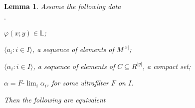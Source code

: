 \documentclass[12pt,letterpaper,oneside,reqno]{amsart}
\newcommand{\mylabel}[1]{{#1}\hfill}
\renewenvironment{itemize}
  {\begin{list}{$\cdot$}{%
   \setlength{\parskip}{0mm}
   \setlength{\topsep}{.2\baselineskip}
   \setlength{\rightmargin}{0mm}
   \setlength{\listparindent}{0mm}
   \setlength{\itemindent}{0mm}
   \setlength{\labelwidth}{3ex}
   \setlength{\itemsep}{.2\baselineskip}
   \setlength{\parsep}{.2\baselineskip}
   \setlength{\partopsep}{0mm}
   \setlength{\labelsep}{1ex}
   \setlength{\leftmargin}{\labelwidth+\labelsep}
   \let\makelabel\mylabel}}{%
   \end{list}}
\theoremstyle{plain}
\newtheorem{lemma}[theorem]{Lemma}
\theoremstyle{remark}
\begin{document}
\begin{lemma}\label{lem_HIapprox}
  Assume the following data
  \begin{itemize}
    \item $\varphi(x;y)\in\mathds{L}$;
    \item $\langle a_i:i\in I\rangle$, a sequence of elements of $M^{|x|}$;
    \item $\langle\alpha_i:i\in I\rangle$, a sequence of elements of $C\subseteq R^{|y|}$, a compact set;
    \item $\alpha=F\mbox{-}\lim_i\alpha_i$, for some ultrafilter $F$ on $I$.
  \end{itemize}
  Then the following are equivalent
  

\end{lemma}
\end{document}
